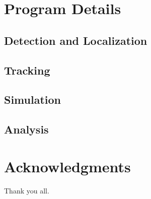 \documentclass[oneside,letterpaper]{scrbook}
\begin{document}
\chapter{Program Details}

\section{Detection and Localization}

\section{Tracking}

\section{Simulation}

\section{Analysis}

\backmatter
\chapter{Acknowledgments}
Thank you all.



\end{document}
